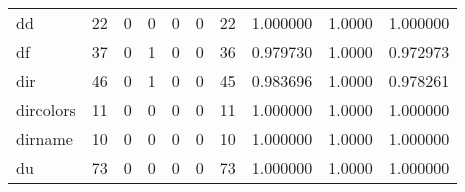 \begin{longtable}{lrrrrrrrrr}
dd        &                                       22 &                                                  0 &                                                  0 &                                                  0 &                                                  0 &                                                 22 &                                           1.000000 &                                 1.0000 &                             1.000000 \\
df        &                                       37 &                                                  0 &                                                  1 &                                                  0 &                                                  0 &                                                 36 &                                           0.979730 &                                 1.0000 &                             0.972973 \\
dir       &                                       46 &                                                  0 &                                                  1 &                                                  0 &                                                  0 &                                                 45 &                                           0.983696 &                                 1.0000 &                             0.978261 \\
dircolors &                                       11 &                                                  0 &                                                  0 &                                                  0 &                                                  0 &                                                 11 &                                           1.000000 &                                 1.0000 &                             1.000000 \\
dirname   &                                       10 &                                                  0 &                                                  0 &                                                  0 &                                                  0 &                                                 10 &                                           1.000000 &                                 1.0000 &                             1.000000 \\
du        &                                       73 &                                                  0 &                                                  0 &                                                  0 &                                                  0 &                                                 73 &                                           1.000000 &                                 1.0000 &                             1.000000 \\

\end{longtable}
